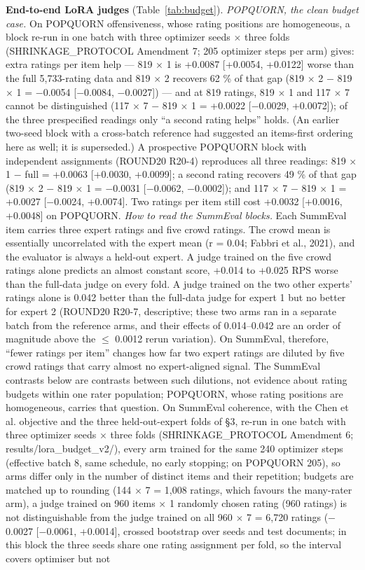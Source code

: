 \documentclass[10pt]{article}
\begin{document}
\textbf{End-to-end LoRA judges} (Table~\ref{tab:budget}). \emph{POPQUORN, the clean budget case.} On POPQUORN offensiveness, whose rating positions are homogeneous, a block re-run in one batch with three optimizer seeds $\times$ three folds (SHRINKAGE\_PROTOCOL Amendment 7; 205 optimizer steps per arm) gives: extra ratings per item help --- 819 $\times$ 1 is +0.0087 {[}+0.0054, +0.0122{]} worse than the full 5,733-rating data and 819 $\times$ 2 recovers 62 \% of that gap (819 $\times$ 2 $-$ 819 $\times$ 1 = $-$0.0054 {[}$-$0.0084, $-$0.0027{]}) --- and at 819 ratings, 819 $\times$ 1 and 117 $\times$ 7 cannot be distinguished (117 $\times$ 7 $-$ 819 $\times$ 1 = +0.0022 {[}$-$0.0029, +0.0072{]}); of the three prespecified readings only ``a second rating helps'' holds. (An earlier two-seed block with a cross-batch reference had suggested an items-first ordering here as well; it is superseded.) A prospective POPQUORN block with independent assignments (ROUND20 R20-4) reproduces all three readings: 819 $\times$ 1 $-$ full = +0.0063 {[}+0.0030, +0.0099{]}; a second rating recovers 49 \% of that gap (819 $\times$ 2 $-$ 819 $\times$ 1 = $-$0.0031 {[}$-$0.0062, $-$0.0002{]}); and 117 $\times$ 7 $-$ 819 $\times$ 1 = +0.0027 {[}$-$0.0024, +0.0074{]}. Two ratings per item still cost +0.0032 {[}+0.0016, +0.0048{]} on POPQUORN. \emph{How to read the SummEval blocks.} Each SummEval item carries three expert ratings and five crowd ratings. The crowd mean is essentially uncorrelated with the expert mean (r = 0.04; Fabbri et al., 2021), and the evaluator is always a held-out expert. A judge trained on the five crowd ratings alone predicts an almost constant score, +0.014 to +0.025 RPS worse than the full-data judge on every fold. A judge trained on the two other experts' ratings alone is 0.042 better than the full-data judge for expert 1 but no better for expert 2 (ROUND20 R20-7, descriptive; these two arms ran in a separate batch from the reference arms, and their effects of 0.014--0.042 are an order of magnitude above the $\leq$ 0.0012 rerun variation). On SummEval, therefore, ``fewer ratings per item'' changes how far two expert ratings are diluted by five crowd ratings that carry almost no expert-aligned signal. The SummEval contrasts below are contrasts between such dilutions, not evidence about rating budgets within one rater population; POPQUORN, whose rating positions are homogeneous, carries that question. On SummEval coherence, with the Chen et al. objective and the three held-out-expert folds of \S{}3, re-run in one batch with three optimizer seeds $\times$ three folds (SHRINKAGE\_PROTOCOL Amendment 6; results/lora\_budget\_v2/), every arm trained for the same 240 optimizer steps (effective batch 8, same schedule, no early stopping; on POPQUORN 205), so arms differ only in the number of distinct items and their repetition; budgets are matched up to rounding (144 $\times$ 7 = 1,008 ratings, which favours the many-rater arm), a judge trained on 960 items $\times$ 1 randomly chosen rating (960 ratings) is not distinguishable from the judge trained on all 960 $\times$ 7 = 6,720 ratings ($-$0.0027 {[}$-$0.0061, +0.0014{]}, crossed bootstrap over seeds and test documents; in this block the three seeds share one rating assignment per fold, so the interval covers optimiser but not 
\end{document}
